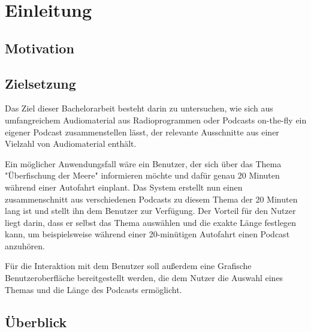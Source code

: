 \chapter{Einleitung}\label{ch:intro}

\section{Motivation}

\section{Zielsetzung}


Das Ziel dieser Bachelorarbeit besteht darin zu untersuchen, wie sich aus umfangreichem Audiomaterial aus Radioprogrammen oder Podcasts on-the-fly ein eigener Podcast zusammenstellen lässt, der relevante Ausschnitte aus einer Vielzahl von Audiomaterial enthält.

Ein möglicher Anwendungsfall wäre ein Benutzer, der sich über das Thema "Überfischung der Meere" informieren möchte und dafür genau 20 Minuten während einer Autofahrt einplant. Das System erstellt nun einen zusammenschnitt aus verschiedenen Podcasts zu diesem Thema der 20 Minuten lang ist und stellt ihn dem Benutzer zur Verfügung. Der Vorteil für den Nutzer liegt darin, dass er selbst das Thema auswählen und die exakte Länge festlegen kann, um beispielsweise während einer 20-minütigen Autofahrt einen Podcast anzuhören.

Für die Interaktion mit dem Benutzer soll außerdem eine Grafische Benutzeroberfläche bereitgestellt werden, die dem Nutzer die Auswahl eines Themas und die Länge des Podcasts ermöglicht.

\section{Überblick}





